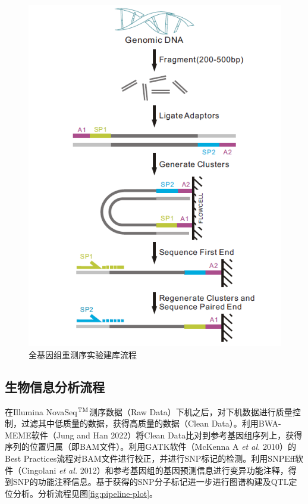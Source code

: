 \documentclass[
  a4paper,
  titlepage]{article}
\begin{document}
\begin{figure}[H]

{\centering \includegraphics[width=0.5\linewidth]{static/images/library} 

}

\caption{全基因组重测序实验建库流程}\label{fig:library-plot}
\end{figure}

\hypertarget{ux751fux7269ux4fe1ux606fux5206ux6790ux6d41ux7a0b}{%
\subsection{生物信息分析流程}\label{ux751fux7269ux4fe1ux606fux5206ux6790ux6d41ux7a0b}}

在Illumina NovaSeq\(\rm{^{TM}}\)测序数据（Raw Data）下机之后，对下机数据进行质量控制，过滤其中低质量的数据，获得高质量的数据（Clean Data）。利用BWA-MEME软件（Jung and Han 2022）将Clean Data比对到参考基因组序列上，获得序列的位置归属（即BAM文件）。利用GATK软件（McKenna A \emph{et al.} 2010）的Best Practices流程对BAM文件进行校正，并进行SNP标记的检测。利用SNPEff软件（Cingolani \emph{et al.} 2012）和参考基因组的基因预测信息进行变异功能注释，得到SNP的功能注释信息。基于获得的SNP分子标记进一步进行图谱构建及QTL定位分析。分析流程见图\ref{fig:pipeline-plot}。
\end{document}
